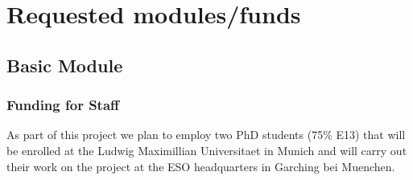 \documentclass[10pt,fleqn,twoside]{article}
\begin{document}

\section{Requested modules/funds}
\renewcommand{\leftmark}{\sc  Requested modules/funds}

\subsection{Basic Module}

\subsubsection{Funding for Staff}

As part of this project we plan to employ two PhD students (75\% E13) that will be enrolled at the Ludwig Maximillian Universitaet in Munich and will carry out their work on the project at the ESO headquarters in Garching bei Muenchen.
\end{document}
